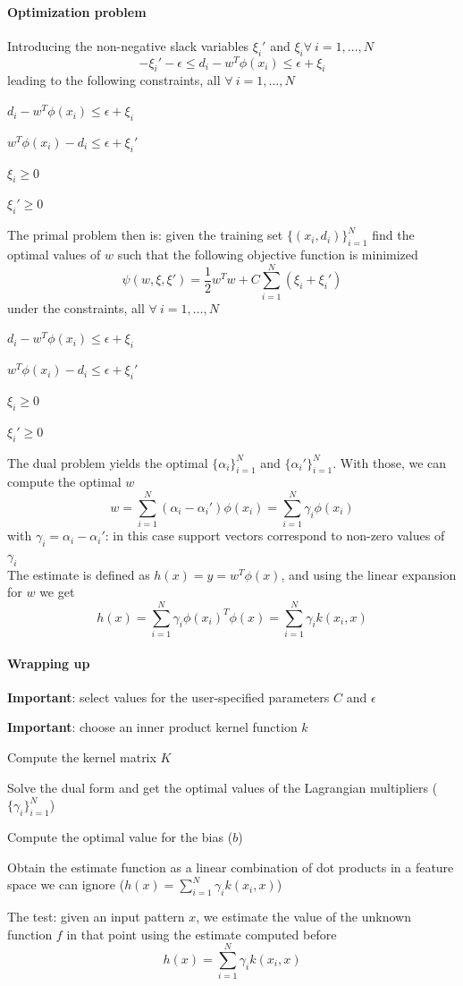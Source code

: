 \documentclass[10pt]{report}
\begin{document}
\paragraph{Optimization problem} Introducing the non-negative slack variables $\xi_i'$ and $\xi_i\forall\:i=1,\ldots,N$ $$-\xi_i'-\epsilon \leq d_i-w^T\phi(x_i)\leq \epsilon + \xi_i$$
leading to the following constraints, all $\forall\:i=1,\ldots,N$
\begin{list}{}{}
	\item $d_i - w^T\phi(x_i)\leq \epsilon + \xi_i$
	\item $w^T\phi(x_i)-d_i\leq \epsilon + \xi_i'$
	\item $\xi_i\geq 0$
	\item $\xi_i'\geq 0$
\end{list}
The primal problem then is: given the training set $\{(x_i, d_i)\}_{i=1}^N$ find the optimal values of $w$ such that the following objective function is minimized $$\psi(w,\xi,\xi') = \frac{1}{2}w^Tw + C\sum_{i=1}^N\left(\xi_i+\xi_i'\right)$$ under the constraints, all $\forall\:i=1,\ldots,N$
\begin{list}{}{}
	\item $d_i - w^T\phi(x_i)\leq \epsilon + \xi_i$
	\item $w^T\phi(x_i)-d_i\leq \epsilon + \xi_i'$
	\item $\xi_i\geq 0$
	\item $\xi_i'\geq 0$
\end{list}
The dual problem yields the optimal $\{\alpha_i\}_{i=1}^N$ and $\{\alpha_i'\}_{i=1}^N$. With those, we can compute the optimal $w$ $$w=\sum_{i=1}^N(\alpha_i - \alpha_i')\phi(x_i) = \sum_{i=1}^N\gamma_i\phi(x_i)$$
with $\gamma_i = \alpha_i - \alpha_i'$: in this case support vectors correspond to non-zero values of $\gamma_i$\\
The estimate is defined as $h(x) = y = w^T\phi(x)$, and using the linear expansion for $w$ we get $$h(x) = \sum_{i=1}^N\gamma_i\phi(x_i)^T\phi(x) = \sum_{i=1}^N\gamma_i k(x_i, x)$$
\paragraph{Wrapping up}
\begin{list}{}{}
	\item \textbf{Important}: select values for the user-specified parameters $C$ and $\epsilon$
	\item \textbf{Important}: choose an inner product kernel function $k$
	\item Compute the kernel matrix $K$
	\item Solve the dual form and get the optimal values of the Lagrangian multipliers ($\{\gamma_i\}_{i=1}^N$)
	\item Compute the optimal value for the bias ($b$)
	\item Obtain the estimate function as a linear combination of dot products in a feature space we can ignore ($h(x) = \sum_{i=1}^N \gamma_ik(x_i, x)$)
\end{list}
The test: given an input pattern $x$, we estimate the value of the unknown function $f$ in that point using the estimate computed before $$h(x) = \sum_{i=1}^N\gamma_i k(x_i,x)$$
\end{document}

